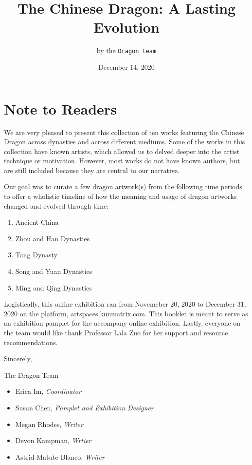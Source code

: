 \documentclass[
]{book}
\title{The Chinese Dragon: A Lasting Evolution}
\author{by the \texttt{Dragon\ team}}
\date{December 14, 2020}
\providecommand{\tightlist}{%
  \setlength{\itemsep}{0pt}\setlength{\parskip}{0pt}}
\begin{document}
\maketitle

{
\setcounter{tocdepth}{1}
\tableofcontents
}
\hypertarget{note-to-readers}{%
\chapter*{Note to Readers}\label{note-to-readers}}

We are very pleased to present this collection of ten works featuring the Chinese Dragon across dynasties and across different mediums. Some of the works in this collection have known artists, which allowed us to delved deeper into the artist technique or motivation. However, most works do not have known authors, but are still included because they are central to our narrative.

Our goal was to curate a few dragon artwork(s) from the following time periods to offer a wholistic timeline of how the meaning and usage of dragon artworks changed and evolved through time:

\begin{enumerate}
\def\labelenumi{\arabic{enumi}.}
\tightlist
\item
  Ancient China
\item
  Zhou and Han Dynasties
\item
  Tang Dynasty
\item
  Song and Yuan Dynasties
\item
  Ming and Qing Dynasties
\end{enumerate}

Logistically, this online exhibition ran from Novemeber 20, 2020 to December 31, 2020 on the platform, artspaces.kunmatrix.com. This booklet is meant to serve as an exhibition pamplet for the accompany online exhibition. Lastly, everyone on the team would like thank Professor Lala Zuo for her support and resource recommendations.

Sincerely,

The Dragon Team

\begin{itemize}
\tightlist
\item
  Erica Im, \emph{Coordinator}
\item
  Susan Chen, \emph{Pamplet and Exhibition Designer}
\item
  Megan Rhodes, \emph{Writer}
\item
  Devon Kampman, \emph{Wrtier}
\item
  Astrid Matute Blanco, \emph{Writer}
\end{itemize}
\end{document}
